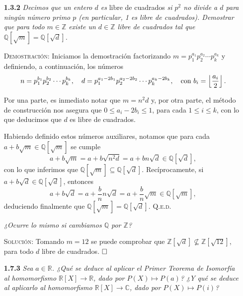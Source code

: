 \documentclass{article}
\begin{document}
\begin{enumerate}
    \vspace{12px}

    \item[\textbf{1.3.2}] \textit{Decimos que un entero $d$ es} libre de cuadrados \textit{si $p^2$ no divide a $d$ para ningún número primo $p$ (en particular, 1 es libre de cuadrados). Demostrar que para todo $m \in \mathbb{Z}$ existe un $d \in \mathbb{Z}$ libre de cuadrados tal que $\mathbb{Q}[\sqrt{m}] = \mathbb{Q}[\sqrt{d}]$.}
    
    \vspace{7px}

    \textsc{Demostración}: Iniciamos la demostración factorizando $m = p_1^{a_1}p_2^{a_2}\cdots p_k^{a_k}$ y definiendo, a continuación, los números \[n = p_1^{b_1}p_2^{b_2}\cdots p_k^{b_k}, \hspace{10px} d = p_1^{a_1 - 2b_1}p_2^{a_2 - 2b_2}\cdots p_k^{a_k - 2b_k}, \hspace{10px} \text{con } b_i = \left\lfloor \frac{a_i}{2}\right\rfloor.\]

    Por una parte, es inmediato notar que $m = n^2d$ y, por otra parte, el método de construcción nos asegura que $0 \leq a_i - 2b_i \leq 1$, para cada $1 \leq i \leq k$, con lo que deducimos que $d$ es libre de cuadrados.

    Habiendo definido estos números auxiliares, notamos que para cada $a + b\sqrt{m} \in \mathbb{Q}[\sqrt{m}]$ se cumple \[a + b\sqrt{m} = a + b\sqrt{n^2d} = a + bn\sqrt{d} \in \mathbb{Q}[\sqrt{d}],\] con lo que inferimos que $\mathbb{Q}[\sqrt{m}] \subseteq \mathbb{Q}[\sqrt{d}]$. Recíprocamente, si $a + b\sqrt{d} \in \mathbb{Q}[\sqrt{d}]$, entonces \[a + b\sqrt{d} = a + \frac{b}{n}n\sqrt{d} = a + \frac{b}{n}\sqrt{m} \in \mathbb{Q}[\sqrt{m}],\] deduciendo finalmente que $\mathbb{Q}[\sqrt{m}] = \mathbb{Q}[\sqrt{d}]$. \hfill{\textsc{Q.e.d.}}

    \vspace{7px}

    \textit{¿Ocurre lo mismo si cambiamos $\mathbb{Q}$ por $\mathbb{Z}$?}

    \vspace{7px}

    \textsc{Solución}: Tomando $m = 12$ se puede comprobar que $\mathbb{Z}[\sqrt{d}] \not\subseteq \mathbb{Z}[\sqrt{12}]$, para todo $d$ libre de cuadrados. $\hfill\square$

    \newpage

    \item[\textbf{1.7.3}] \textit{Sea $a \in \mathbb{R}$. ¿Qué se deduce al aplicar el Primer Teorema de Isomorfía al homomorfismo $\mathbb{R}[X] \to \mathbb{R}$, dado por $P(X) \mapsto P(a)$? ¿Y qué se deduce al aplicarlo al homomorfismo $\mathbb{R}[X] \to \mathbb{C}$, dado por $P(X) \mapsto P(i)$?}


\end{enumerate}
\end{document}
